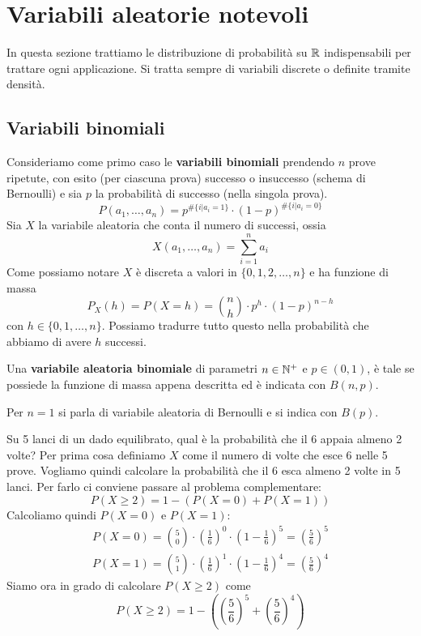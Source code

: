 \section{Variabili aleatorie notevoli}
In questa sezione trattiamo le distribuzione di probabilità su $\mathbb{R}$ indispensabili per trattare
ogni applicazione. Si tratta sempre di variabili discrete o definite tramite densità.

\subsection{Variabili binomiali}
Consideriamo come primo caso le \textbf{variabili binomiali} prendendo $n$ prove ripetute, con
esito (per ciascuna prova) successo o insuccesso (schema di Bernoulli) e sia $p$ la probabilità di
successo (nella singola prova).
\[ P(a_1, \dots, a_n) = p^{\# \{i | a_i=1\}} \cdot (1-p)^{\# \{ i | a_i=0 \}} \]
Sia $X$ la variabile aleatoria che conta il numero di successi, ossia
\[ X(a_1, \dots, a_n) = \sum_{i=1}^n a_i \]
Come possiamo notare $X$ è discreta a valori in $\{0,1,2,\dots,n\}$ e ha funzione di massa
\[ P_X(h) = P(X = h) = \binom{n}{h} \cdot p^h \cdot (1-p)^{n-h} \]
con $h \in \{ 0, 1, \dots, n \}$. Possiamo tradurre tutto questo nella probabilità che abbiamo di
avere $h$ successi.

Una \textbf{variabile aleatoria binomiale} di parametri $n \in \mathbb{N}^+$ e $p \in (0,1)$, è tale se
possiede la funzione di massa appena descritta ed è indicata con $B(n, p)$.

\begin{observation}
	Per $n=1$ si parla di variabile aleatoria di Bernoulli e si indica con $B(p)$.
\end{observation}

\begin{example}
	Su 5 lanci di un dado equilibrato, qual è la probabilità che il 6 appaia almeno 2 volte? Per
	prima cosa definiamo $X$ come il numero di volte che esce 6 nelle 5 prove. Vogliamo quindi
	calcolare la probabilità che il 6 esca almeno 2 volte in 5 lanci. Per farlo ci conviene passare
	al problema complementare:
	\[ P(X \geq 2) = 1 - (P(X = 0) + P(X = 1)) \]
	Calcoliamo quindi $P(X=0)$ e $P(X=1)$:
	\begin{gather*}
		P(X = 0) = \binom{5}{0} \cdot \left(\frac{1}{6}\right)^0 \cdot
		\left(1 - \frac{1}{6}\right)^5 = \left(\frac{5}{6}\right)^5 \\
		P(X = 1) = \binom{5}{1} \cdot \left(\frac{1}{6}\right)^1 \cdot
		\left(1 - \frac{1}{6}\right)^4 = \left(\frac{5}{6}\right)^4
	\end{gather*}
	Siamo ora in grado di calcolare $P(X \geq 2)$ come
	\[ P(X \geq 2) = 1 - \left( \left(\frac{5}{6}\right)^5 + \left(\frac{5}{6}\right)^4 \right) \]
\end{example}

